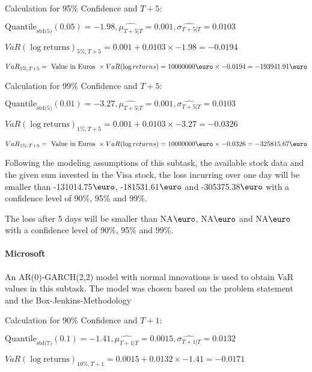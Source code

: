 Calculation for 95\% Confidence and $T+5$:

\indent\indent $\text{Quantile}_\text{std(5)}(0.05) = -1.98,\hat{\mu_{T+5|T}} = 0.001, \hat{\sigma_{T+5|T}} = 0.0103$

\indent\indent $VaR(\log \text{returns})_{5\%, T + 5} = 0.001 + 0.0103\times-1.98 = -0.0194$

\indent\indent $VaR_{5\%, T + 5} = \text{ Value in Euros } \times VaR(\log returns) = 10 000 000 \text{\euro} \times-0.0194 = -193941.91 \text{\euro}$\newline




Calculation for 99\% Confidence and $T+5$:

\indent\indent $\text{Quantile}_\text{std(5)}(0.01) = -3.27,\hat{\mu_{T+5|T}} = 0.001, \hat{\sigma_{T+5|T}} = 0.0103$

\indent\indent $VaR(\log \text{returns})_{1\%, T + 5} = 0.001 + 0.0103\times-3.27 = -0.0326$

\indent\indent $VaR_{1\%, T + 5} = \text{ Value in Euros } \times VaR(\log returns) = 10 000 000 \text{\euro} \times-0.0326 = -325815.67 \text{\euro}$\newline


Following the modeling assumptions of this subtask, the available stock data and the given sum invested in the Visa stock, the loss incurring over one day will be smaller than -131014.75$\text{\euro}$, -181531.61$\text{\euro}$  and -305375.38$\text{\euro}$  with a confidence level of 90\%, 95\%  and 99\%.

The loss after 5 days will be smaller than NA$\text{\euro}$, NA$\text{\euro}$  and NA$\text{\euro}$  with a confidence level of 90\%, 95\%  and 99\%.


\paragraph{Microsoft}
 An AR(0)-GARCH(2,2) model with normal innovations is used to obtain VaR values in this subtask. The model was chosen based on the problem statement and the Box-Jenkins-Methodology





Calculation for 90\% Confidence and $T+1$:

\indent\indent $\text{Quantile}_\text{std(7)}(0.1) = -1.41,\hat{\mu_{T+1|T}} = 0.0015, \hat{\sigma_{T+1|T}} = 0.0132$

\indent\indent $VaR(\log \text{returns})_{10\%, T + 1} = 0.0015 + 0.0132\times-1.41 = -0.0171$

